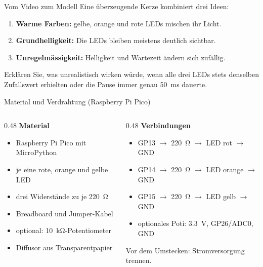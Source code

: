\begin{frame}{Vom Video zum Modell}
	Eine überzeugende Kerze kombiniert drei Ideen:
	\begin{enumerate}[<+->]
		\item \textbf{Warme Farben:} gelbe, orange und rote LEDs mischen ihr Licht.
		\item \textbf{Grundhelligkeit:} Die LEDs bleiben meistens deutlich sichtbar.
		\item \textbf{Unregelmässigkeit:} Helligkeit und Wartezeit ändern sich zufällig.
	\end{enumerate}
	\pause
	\begin{myexercise}
		Erklären Sie, was unrealistisch wirken würde, wenn alle drei LEDs stets denselben
		Zufallswert erhielten oder die Pause immer genau \qty{50}{\milli\second} dauerte.
	\end{myexercise}
\end{frame}

\begin{frame}{Material und Verdrahtung (Raspberry Pi Pico)}
	\begin{columns}[T]
		\begin{column}{0.48\textwidth}
			\textbf{Material}
			\begin{itemize}
				\item Raspberry Pi Pico mit MicroPython
				\item je eine rote, orange und gelbe LED
				\item drei Widerstände zu je \qty{220}{\ohm}
				\item Breadboard und Jumper-Kabel
				\item optional: \qty{10}{\kilo\ohm}-Potentiometer
				\item Diffusor aus Transparentpapier
			\end{itemize}
		\end{column}
		\begin{column}{0.48\textwidth}
			\textbf{Verbindungen}
			\begin{itemize}
				\item GP13 $\rightarrow$ \qty{220}{\ohm} $\rightarrow$ LED rot $\rightarrow$ GND
				\item GP14 $\rightarrow$ \qty{220}{\ohm} $\rightarrow$ LED orange $\rightarrow$ GND
				\item GP15 $\rightarrow$ \qty{220}{\ohm} $\rightarrow$ LED gelb $\rightarrow$ GND
				\item optionales Poti: \qty{3.3}{\volt}, GP26/ADC0, GND
			\end{itemize}
			\alert{Vor dem Umstecken: Stromversorgung trennen.}
		\end{column}
	\end{columns}
\end{frame}

